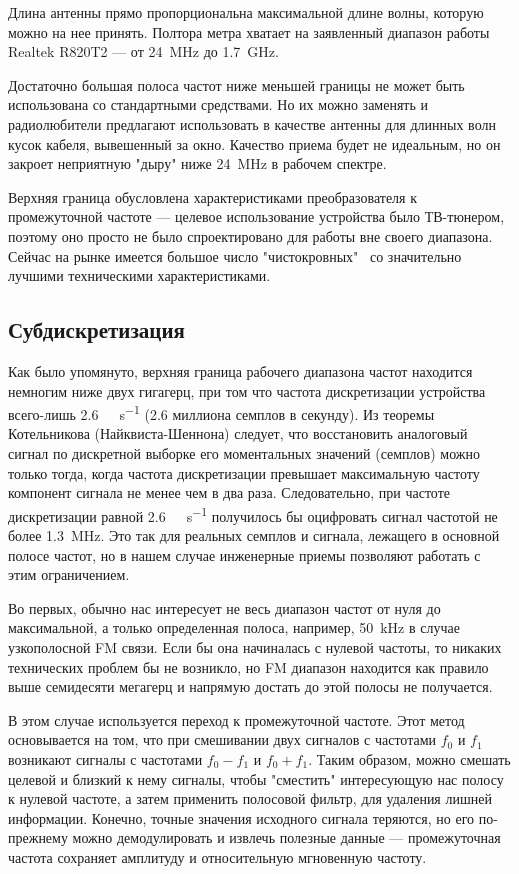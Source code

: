 Длина антенны прямо пропорциональна максимальной длине волны, которую можно на нее принять. Полтора метра хватает на заявленный диапазон работы Realtek R820T2 --- от \SI{24}{\mega\hertz} до \SI{1.7}{\giga\hertz}.

Достаточно большая полоса частот ниже меньшей границы не может быть использована со стандартными средствами. Но их можно заменять и радиолюбители предлагают использовать в качестве антенны для длинных волн кусок кабеля, вывешенный за окно. Качество приема будет не идеальным, но он закроет неприятную "дыру" ниже \SI{24}{\mega\hertz} в рабочем спектре.

Верхняя граница обусловлена характеристиками преобразователя к промежуточной частоте --- целевое использование устройства было ТВ-тюнером, поэтому оно просто не было спроектировано для работы вне своего диапазона. Сейчас на рынке имеется большое число "чистокровных" \SDR\ со значительно лучшими техническими характеристиками.


\subsection{Субдискретизация}

Как было упомянуто, верхняя граница рабочего диапазона частот находится немногим ниже двух гигагерц, при том что частота дискретизации устройства всего-лишь \SI{2.6}{\mega\sample\per\second} (\num{2.6} миллиона семплов в секунду). Из теоремы Котельникова (Найквиста-Шеннона) следует, что восстановить аналоговый сигнал по дискретной выборке его моментальных значений (семплов) можно только тогда, когда частота дискретизации превышает максимальную частоту компонент сигнала не менее чем в два раза. Следовательно, при частоте дискретизации равной \SI{2.6}{\mega\sample\per\second} получилось бы оцифровать сигнал частотой не более \SI{1.3}{\mega\hertz}. Это так для реальных семплов и сигнала, лежащего в основной полосе частот, но в нашем случае инженерные приемы позволяют работать с этим ограничением.

Во первых, обычно нас интересует не весь диапазон частот от нуля до максимальной, а только определенная полоса, например, \SI{50}{\kilo\hertz} в случае узкополосной FM связи. Если бы она начиналась с нулевой частоты, то никаких технических проблем бы не возникло, но FM диапазон находится как правило выше семидесяти мегагерц и напрямую достать до этой полосы не получается.

В этом случае используется переход к промежуточной частоте. Этот метод основывается на том, что при смешивании двух сигналов с частотами $f_0$ и $f_1$ возникают сигналы с частотами $f_0 - f_1$ и $f_0 + f_1$. Таким образом, можно смешать целевой и близкий к нему сигналы, чтобы "сместить" интересующую нас полосу к нулевой частоте, а затем применить полосовой фильтр, для удаления лишней информации. Конечно, точные значения исходного сигнала теряются, но его по-прежнему можно демодулировать и извлечь полезные данные --- промежуточная частота сохраняет амплитуду и относительную мгновенную частоту.

